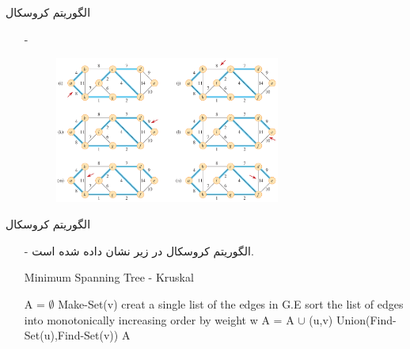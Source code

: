 \begin{frame}{‌الگوریتم کروسکال}
\begin{itemize}\itemr
\item[-]
\begin{figure}
\includegraphics[width=0.7\textwidth]{figs/chap07/593-kruskal}
\end{figure}
\end{itemize}
\end{frame}


\begin{frame}{‌الگوریتم کروسکال}
\begin{itemize}\itemr
\item[-]
الگوریتم کروسکال در زیر نشان داده شده است.
\begin{algorithm}[H]\alglr
  \caption{Minimum Spanning Tree - Kruskal} 
  \begin{algorithmic}[1]
   \State A = $\emptyset$
   			\State Make-Set(v)
   	\EndFor
   	\State creat a single list of the edges in G.E
   	\State sort the list of edges into monotonically increasing order by weight w
   					\State A = A $\cup$ {(u,v)}
   					\State Union(Find-Set(u),Find-Set(v))
   			\EndIf
   	\EndFor
   	\State \Return A                           
  \end{algorithmic}
  \label{alg:merge}
\end{algorithm}
\end{itemize}
\end{frame}



